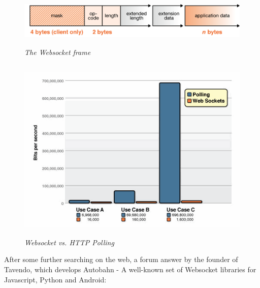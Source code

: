 \documentclass{article}
\begin{document}
\begin{figure}
\includegraphics[height=1in,width=7.12in]{./images/websockets/WebSocketFrame.png}  
\caption{\small \sl The Websocket frame \label{fig:websocket_frame}}
\end{figure}

\begin{figure}
\includegraphics[height=3.5in,width=6.23in]{./images/websockets/poll-ws-compare.png}  
\caption{\small \sl Websocket vs. HTTP Polling
\label{fig:websocket_ws_vs_polling}}
\end{figure}

After some further searching on the web, a forum answer\cite{websockets3} by the
founder of Tavendo, which develops Autobahn - A well-known set of Websocket libraries for
Javascript, Python and Android:\newline
\end{document}
